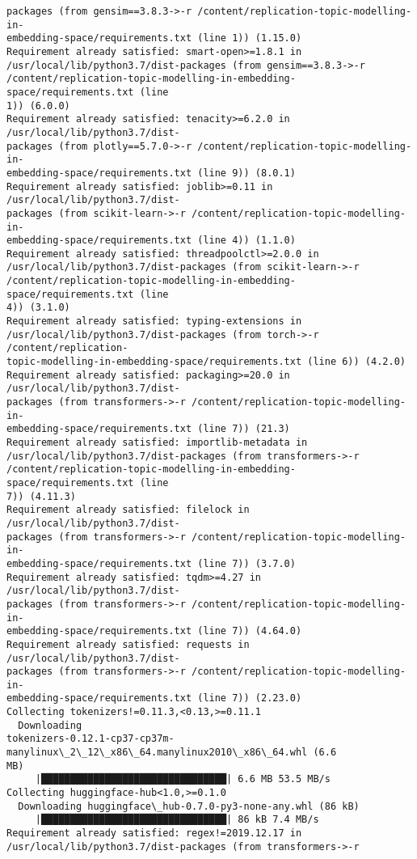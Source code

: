 \documentclass[11pt]{article}
\begin{document}
\begin{Verbatim}[commandchars=\\\{\}]
packages (from gensim==3.8.3->-r /content/replication-topic-modelling-in-
embedding-space/requirements.txt (line 1)) (1.15.0)
Requirement already satisfied: smart-open>=1.8.1 in
/usr/local/lib/python3.7/dist-packages (from gensim==3.8.3->-r
/content/replication-topic-modelling-in-embedding-space/requirements.txt (line
1)) (6.0.0)
Requirement already satisfied: tenacity>=6.2.0 in /usr/local/lib/python3.7/dist-
packages (from plotly==5.7.0->-r /content/replication-topic-modelling-in-
embedding-space/requirements.txt (line 9)) (8.0.1)
Requirement already satisfied: joblib>=0.11 in /usr/local/lib/python3.7/dist-
packages (from scikit-learn->-r /content/replication-topic-modelling-in-
embedding-space/requirements.txt (line 4)) (1.1.0)
Requirement already satisfied: threadpoolctl>=2.0.0 in
/usr/local/lib/python3.7/dist-packages (from scikit-learn->-r
/content/replication-topic-modelling-in-embedding-space/requirements.txt (line
4)) (3.1.0)
Requirement already satisfied: typing-extensions in
/usr/local/lib/python3.7/dist-packages (from torch->-r /content/replication-
topic-modelling-in-embedding-space/requirements.txt (line 6)) (4.2.0)
Requirement already satisfied: packaging>=20.0 in /usr/local/lib/python3.7/dist-
packages (from transformers->-r /content/replication-topic-modelling-in-
embedding-space/requirements.txt (line 7)) (21.3)
Requirement already satisfied: importlib-metadata in
/usr/local/lib/python3.7/dist-packages (from transformers->-r
/content/replication-topic-modelling-in-embedding-space/requirements.txt (line
7)) (4.11.3)
Requirement already satisfied: filelock in /usr/local/lib/python3.7/dist-
packages (from transformers->-r /content/replication-topic-modelling-in-
embedding-space/requirements.txt (line 7)) (3.7.0)
Requirement already satisfied: tqdm>=4.27 in /usr/local/lib/python3.7/dist-
packages (from transformers->-r /content/replication-topic-modelling-in-
embedding-space/requirements.txt (line 7)) (4.64.0)
Requirement already satisfied: requests in /usr/local/lib/python3.7/dist-
packages (from transformers->-r /content/replication-topic-modelling-in-
embedding-space/requirements.txt (line 7)) (2.23.0)
Collecting tokenizers!=0.11.3,<0.13,>=0.11.1
  Downloading
tokenizers-0.12.1-cp37-cp37m-manylinux\_2\_12\_x86\_64.manylinux2010\_x86\_64.whl (6.6
MB)
     |████████████████████████████████| 6.6 MB 53.5 MB/s
Collecting huggingface-hub<1.0,>=0.1.0
  Downloading huggingface\_hub-0.7.0-py3-none-any.whl (86 kB)
     |████████████████████████████████| 86 kB 7.4 MB/s
Requirement already satisfied: regex!=2019.12.17 in
/usr/local/lib/python3.7/dist-packages (from transformers->-r

\end{Verbatim}
\end{document}
